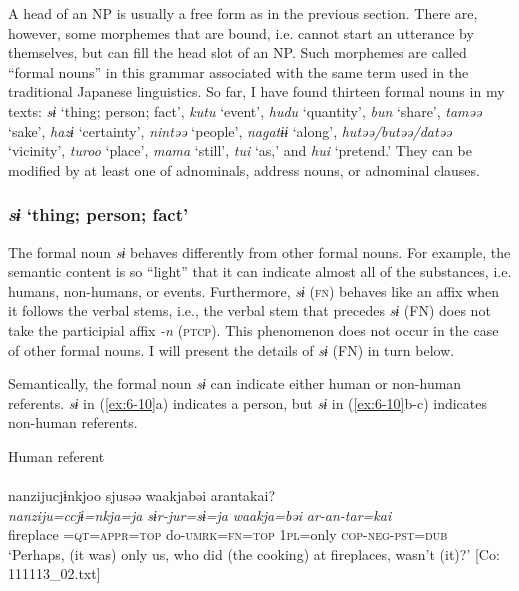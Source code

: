A head of an NP is usually a free form as in the previous section. There are, however, some morphemes that are bound, i.e. cannot start an utterance by themselves, but can fill the head slot of an NP. Such morphemes are called “formal nouns” in this grammar associated with the same term used in the traditional Japanese linguistics. So far, I have found thirteen formal nouns in my texts: \textit{sɨ} ‘thing; person; fact’, \textit{kutu} ‘event’, \textit{hudu} ‘quantity’, \textit{bun} ‘share’, \textit{taməə} ‘sake’, \textit{hazɨ} ‘certainty’, \textit{nintəə} ‘people’, \textit{nagatɨɨ} ‘along’, \textit{hutəə/butəə/datəə} ‘vicinity’, \textit{turoo} ‘place’, \textit{mama} ‘still’, \textit{tui} ‘as,’ and \textit{hui} ‘pretend.’ They can be modified by at least one of adnominals, address nouns, or adnominal clauses.

\subsubsection{\textit{sɨ} ‘thing; person; fact’}

The formal noun \textit{sɨ} behaves differently from other formal nouns. For example, the semantic content is so “light” that it can indicate almost all of the substances, i.e. humans, non-humans, or events. Furthermore, \textit{sɨ} (\textsc{fn}) behaves like an affix when it follows the verbal stems, i.e., the verbal stem that precedes \textit{sɨ} (FN) does not take the participial affix \textit{-n} (\textsc{ptcp}). This phenomenon does not occur in the case of other formal nouns. I will present the details of \textit{sɨ} (FN) in turn below.

Semantically, the formal noun \textit{sɨ} can indicate either human or non-human referents. \textit{sɨ} in (\ref{ex:6-10}a) indicates a person, but \textit{sɨ} in (\ref{ex:6-10}b-c) indicates non-human referents.

\ea\label{ex:6-10}
 Human referent\\

 \ea{}\\
{\TM}
\glll nanzijucjɨnkjoo  sjusəə  waakjabəi  arantakai?\\
\textit{nanziju=ccjɨ=nkja=ja}  \textit{sɨr-jur=sɨ=ja}  \textit{waakja=bəi}   \textit{ar-an-tar=kai}\\
fireplace =\textsc{qt}=\textsc{appr}=\textsc{top}  do-\textsc{umrk}=\textsc{fn}=\textsc{top}  1\textsc{pl}=only     \textsc{cop}-\textsc{neg}-\textsc{pst}=\textsc{dub}\\
\glt ‘Perhaps, (it was) only us, who did (the cooking) at fireplaces, wasn’t (it)?’ [Co: 111113\_02.txt]
\z

